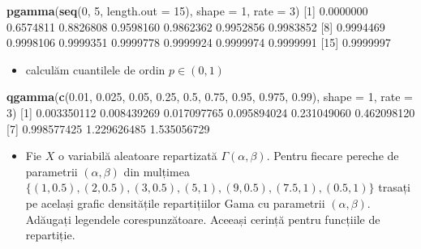\documentclass[]{article}
\newenvironment{Shaded}{\begin{snugshade}}{\end{snugshade}}
\newcommand{\KeywordTok}[1]{\textcolor[rgb]{0.13,0.29,0.53}{\textbf{#1}}}
\newcommand{\DataTypeTok}[1]{\textcolor[rgb]{0.13,0.29,0.53}{#1}}
\newcommand{\DecValTok}[1]{\textcolor[rgb]{0.00,0.00,0.81}{#1}}
\newcommand{\FloatTok}[1]{\textcolor[rgb]{0.00,0.00,0.81}{#1}}
\newcommand{\NormalTok}[1]{#1}
\providecommand{\tightlist}{%
  \setlength{\itemsep}{0pt}\setlength{\parskip}{0pt}}
\newenvironment{frshaded*}{%
  \def\FrameCommand{\fboxrule=\FrameRule\fboxsep=\FrameSep \fcolorbox{framecolor}{shadecolor1}}%
  \MakeFramed {\advance\hsize-\width \FrameRestore}}%
{\endMakeFramed}
\newenvironment{rmdblock}[1]
  {\begin{frshaded*}
  \begin{itemize}
  \renewcommand{\labelitemi}{
    \raisebox{-.7\height}[0pt][0pt]{
      {\setkeys{Gin}{width=2em,keepaspectratio}\texttt{[image: images/icons/\#1]}}
    }
  }
  \item
  }
  {
  \end{itemize}
  \end{frshaded*}
  }
\newenvironment{rmdexercise}
  {\begin{rmdblock}{exercise}}
  {\end{rmdblock}}
\begin{document}
\begin{Shaded}
\begin{Highlighting}[]
\KeywordTok{pgamma}\NormalTok{(}\KeywordTok{seq}\NormalTok{(}\DecValTok{0}\NormalTok{, }\DecValTok{5}\NormalTok{, }\DataTypeTok{length.out =} \DecValTok{15}\NormalTok{), }\DataTypeTok{shape =} \DecValTok{1}\NormalTok{, }\DataTypeTok{rate =} \DecValTok{3}\NormalTok{)}
\NormalTok{ [}\DecValTok{1}\NormalTok{] }\FloatTok{0.0000000} \FloatTok{0.6574811} \FloatTok{0.8826808} \FloatTok{0.9598160} \FloatTok{0.9862362} \FloatTok{0.9952856} \FloatTok{0.9983852}
\NormalTok{ [}\DecValTok{8}\NormalTok{] }\FloatTok{0.9994469} \FloatTok{0.9998106} \FloatTok{0.9999351} \FloatTok{0.9999778} \FloatTok{0.9999924} \FloatTok{0.9999974} \FloatTok{0.9999991}
\NormalTok{[}\DecValTok{15}\NormalTok{] }\FloatTok{0.9999997}
\end{Highlighting}
\end{Shaded}

\begin{itemize}
\tightlist
\item
  calculăm cuantilele de ordin \(p\in(0,1)\)
\end{itemize}

\begin{Shaded}
\begin{Highlighting}[]
\KeywordTok{qgamma}\NormalTok{(}\KeywordTok{c}\NormalTok{(}\FloatTok{0.01}\NormalTok{, }\FloatTok{0.025}\NormalTok{, }\FloatTok{0.05}\NormalTok{, }\FloatTok{0.25}\NormalTok{, }\FloatTok{0.5}\NormalTok{, }\FloatTok{0.75}\NormalTok{, }\FloatTok{0.95}\NormalTok{, }\FloatTok{0.975}\NormalTok{, }\FloatTok{0.99}\NormalTok{), }\DataTypeTok{shape =} \DecValTok{1}\NormalTok{, }\DataTypeTok{rate =} \DecValTok{3}\NormalTok{)}
\NormalTok{[}\DecValTok{1}\NormalTok{] }\FloatTok{0.003350112} \FloatTok{0.008439269} \FloatTok{0.017097765} \FloatTok{0.095894024} \FloatTok{0.231049060} \FloatTok{0.462098120}
\NormalTok{[}\DecValTok{7}\NormalTok{] }\FloatTok{0.998577425} \FloatTok{1.229626485} \FloatTok{1.535056729}
\end{Highlighting}
\end{Shaded}

\begin{rmdexercise}
Fie \(X\) o variabilă aleatoare repartizată \(\Gamma(\alpha, \beta)\).
Pentru fiecare pereche de parametrii \((\alpha, \beta)\) din mulțimea
\(\{(1,0.5), (2, 0.5), (3, 0.5), (5, 1), (9, 0.5), (7.5, 1), (0.5, 1) \}\)
trasați pe același grafic densitățile repartițiilor Gama cu parametrii
\((\alpha, \beta)\). Adăugați legendele corespunzătoare. Aceeași cerință
pentru funcțiile de repartiție.
\end{rmdexercise}
\end{document}
